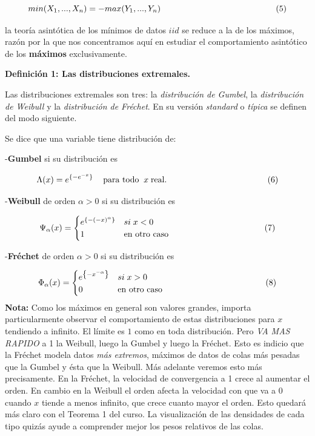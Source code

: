 \documentclass[
]{book}
\theoremstyle{definition}
\theoremstyle{definition}
\theoremstyle{definition}
\theoremstyle{definition}
\theoremstyle{remark}
\begin{document}
\begin{equation}
min(X_1,...,X_n) = - max(Y_1,...,Y_n)\hspace{4.8cm}(5)
\end{equation}

la teoría asintótica de los mínimos de datos \(iid\)
se reduce a la de los máximos, razón por la que
nos concentramos aquí en estudiar el
comportamiento asintótico de los \textbf{máximos}
exclusivamente.

\textbf{Definición 1: Las distribuciones extremales.}

Las distribuciones extremales son tres: la
\emph{distribución de Gumbel}, la \emph{distribución de Weibull} y
la \emph{distribución de Fréchet}. En su versión \emph{standard} o \emph{típica} se definen del modo
siguiente.

Se dice que una variable tiene distribución de:

-\textbf{Gumbel} si su distribución es

\[\Lambda(x) = e^{\{-e^{-x}\}}\hspace{0.3cm}\text{ para todo }\: x \;\text{real}.\hspace{4.2cm} (6)\]

-\textbf{Weibull} de orden \(\alpha>0\) si su distribución es

\[\Psi_{\alpha}(x)=\begin{cases}
e^{\left\{-(-x)^{\alpha}  \right\}} & si\;x<0\\
1 & \text{en otro caso}
\end{cases} \hspace{3.9cm} (7)\]

-\textbf{Fréchet} de orden \(\alpha>0\) si su distribución es

\[
\Phi_{\alpha}(x)=\begin{cases}
e^{\left\{ -x^{-\alpha}\right\}} & si\;x>0\\
0 & \text{en otro caso}
\end{cases} \hspace{4.2cm} (8) 
\]
\textbf{Nota:} Como los máximos en general son valores grandes,
importa particularmente observar el comportamiento de estas distribuciones para \(x\) tendiendo a infinito. El límite es \(1\) como en toda distribución. Pero \emph{VA MAS RAPIDO} a 1 la Weibull, luego la Gumbel y luego la Fréchet. Esto es indicio que la
Fréchet modela datos \emph{más extremos}, máximos de datos de
colas más pesadas que la Gumbel y ésta que la Weibull. Más
adelante veremos esto más precisamente. En la Fréchet, la
velocidad de convergencia a 1 crece al aumentar el orden. En cambio en la Weibull el orden afecta la velocidad con que va a 0 cuando \(x\) tiende a menos infinito, que crece cuanto mayor el orden. Esto quedará más claro con el Teorema 1 del curso. La visualización de las densidades de cada tipo quizás ayude a comprender mejor los pesos relativos de las colas.
\end{document}
